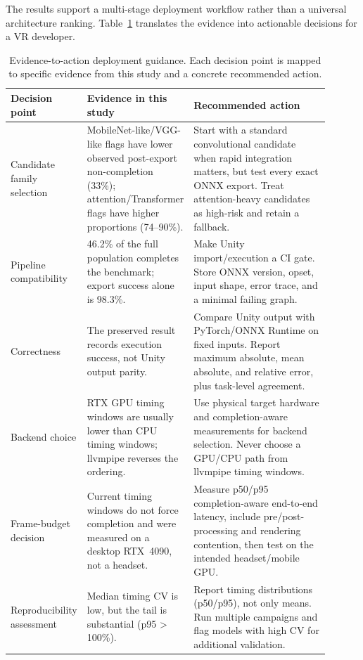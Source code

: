 \documentclass[10pt,twocolumn]{article}
\begin{document}
The results support a multi-stage deployment workflow rather than a universal architecture ranking. Table~\ref{tab:guidance} translates the evidence into actionable decisions for a VR developer.

\begin{table}[t]
\centering\small
\begin{tabular}{p{0.18\linewidth}p{0.26\linewidth}p{0.46\linewidth}}
\toprule
Decision point & Evidence in this study & Recommended action \\
\midrule
Candidate family selection & MobileNet-like/VGG-like flags have lower observed post-export non-completion (33\%); attention/Transformer flags have higher proportions (74--90\%). & Start with a standard convolutional candidate when rapid integration matters, but test every exact ONNX export. Treat attention-heavy candidates as high-risk and retain a fallback. \\
\midrule
Pipeline compatibility & 46.2\% of the full population completes the benchmark; export success alone is 98.3\%. & Make Unity import/execution a CI gate. Store ONNX version, opset, input shape, error trace, and a minimal failing graph. \\
\midrule
Correctness & The preserved result records execution success, not Unity output parity. & Compare Unity output with PyTorch/ONNX Runtime on fixed inputs. Report maximum absolute, mean absolute, and relative error, plus task-level agreement. \\
\midrule
Backend choice & RTX GPU timing windows are usually lower than CPU timing windows; llvmpipe reverses the ordering. & Use physical target hardware and completion-aware measurements for backend selection. Never choose a GPU/CPU path from llvmpipe timing windows. \\
\midrule
Frame-budget decision & Current timing windows do not force completion and were measured on a desktop RTX~4090, not a headset. & Measure p50/p95 completion-aware end-to-end latency, include pre/post-processing and rendering contention, then test on the intended headset/mobile GPU. \\
\midrule
Reproducibility assessment & Median timing CV is low, but the tail is substantial (p95 > 100\%). & Report timing distributions (p50/p95), not only means. Run multiple campaigns and flag models with high CV for additional validation. \\
\bottomrule
\end{tabular}
\caption{Evidence-to-action deployment guidance. Each decision point is mapped to specific evidence from this study and a concrete recommended action.}
\label{tab:guidance}
\end{table}
\end{document}
